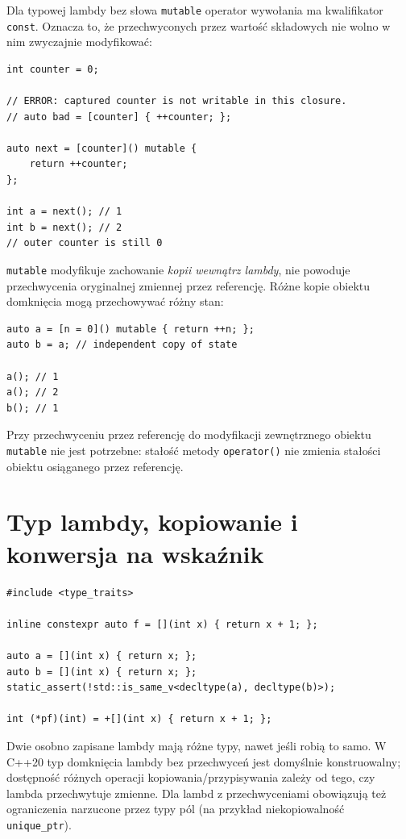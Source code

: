 Dla typowej lambdy bez słowa \texttt{mutable} operator wywołania ma
kwalifikator \texttt{const}. Oznacza to, że przechwyconych przez wartość
składowych nie wolno w nim zwyczajnie modyfikować:

\begin{lstlisting}
int counter = 0;

// ERROR: captured counter is not writable in this closure.
// auto bad = [counter] { ++counter; };

auto next = [counter]() mutable {
    return ++counter;
};

int a = next(); // 1
int b = next(); // 2
// outer counter is still 0
\end{lstlisting}

\texttt{mutable} modyfikuje zachowanie \emph{kopii wewnątrz lambdy},
nie powoduje przechwycenia oryginalnej zmiennej przez referencję.
Różne kopie obiektu domknięcia mogą przechowywać różny stan:

\begin{lstlisting}
auto a = [n = 0]() mutable { return ++n; };
auto b = a; // independent copy of state

a(); // 1
a(); // 2
b(); // 1
\end{lstlisting}

Przy przechwyceniu przez referencję do modyfikacji zewnętrznego
obiektu \texttt{mutable} nie jest potrzebne: stałość metody
\texttt{operator()} nie zmienia stałości obiektu osiąganego przez
referencję.

\section{Typ lambdy, kopiowanie i konwersja na wskaźnik}

\begin{lstlisting}
#include <type_traits>

inline constexpr auto f = [](int x) { return x + 1; };

auto a = [](int x) { return x; };
auto b = [](int x) { return x; };
static_assert(!std::is_same_v<decltype(a), decltype(b)>);

int (*pf)(int) = +[](int x) { return x + 1; };
\end{lstlisting}

Dwie osobno zapisane lambdy mają różne typy, nawet jeśli robią to samo.
W C++20 typ domknięcia lambdy bez przechwyceń jest domyślnie
konstruowalny; dostępność różnych operacji kopiowania/przypisywania
zależy od tego, czy lambda przechwytuje zmienne. Dla lambd z
przechwyceniami obowiązują też ograniczenia narzucone przez typy pól
(na przykład niekopiowalność \texttt{unique\_ptr}).

